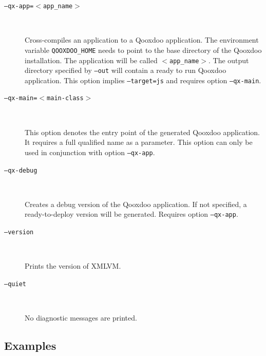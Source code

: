 \documentclass[11pt]{book}
\begin{document}
\begin{description}
\item[\texttt{--qx-app=$<$app\_name$>$}] $ $

  Cross-compiles an application to a Qooxdoo application. The
  environment variable \texttt{QOOXDOO\_HOME} needs to point to the
  base directory of the Qooxdoo installation. The application will be
  called \texttt{$<$app\_name$>$}. The output directory specified by
  \texttt{--out} will contain a ready to run Qooxdoo application. This
  option implies \texttt{--target=js} and requires option
  \texttt{--qx-main}.

\item[\texttt{--qx-main=$<$main-class$>$}] $ $

  This option denotes the entry point of the generated Qooxdoo
  application. It requires a full qualified name as a parameter. This
  option can only be used in conjunction with option
  \texttt{--qx-app}.

\item[\texttt{--qx-debug}] $ $

  Creates a debug version of the Qooxdoo application.  If not
  specified, a ready-to-deploy version will be generated.  Requires
  option \texttt{--qx-app}.

\item[\texttt{--version}] $ $

  Prints the version of XMLVM.

\item[\texttt{--quiet}] $ $

  No diagnostic messages are printed.

\end{description}


\subsection{Examples}
\label{SEC_COMMAND_LINE_OPTIONS_EXAMPLES}
\end{document}
